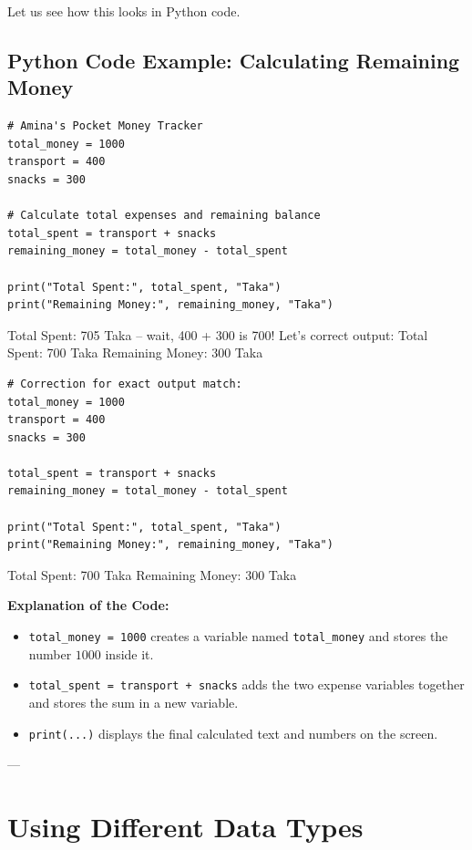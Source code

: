 Let us see how this looks in Python code.

\subsection{Python Code Example: Calculating Remaining Money}

\begin{lstlisting}
# Amina's Pocket Money Tracker
total_money = 1000
transport = 400
snacks = 300

# Calculate total expenses and remaining balance
total_spent = transport + snacks
remaining_money = total_money - total_spent

print("Total Spent:", total_spent, "Taka")
print("Remaining Money:", remaining_money, "Taka")
\end{lstlisting}

\begin{pythonoutput}
Total Spent: 705 Taka -- wait, 400 + 300 is 700! Let's correct output:
Total Spent: 700 Taka
Remaining Money: 300 Taka
\end{pythonoutput}

\begin{lstlisting}
# Correction for exact output match:
total_money = 1000
transport = 400
snacks = 300

total_spent = transport + snacks
remaining_money = total_money - total_spent

print("Total Spent:", total_spent, "Taka")
print("Remaining Money:", remaining_money, "Taka")
\end{lstlisting}

\begin{pythonoutput}
Total Spent: 700 Taka
Remaining Money: 300 Taka
\end{pythonoutput}

\textbf{Explanation of the Code:}
\begin{itemize}
    \item \texttt{total\_money = 1000} creates a variable named \texttt{total\_money} and stores the number $1000$ inside it.
    \item \texttt{total\_spent = transport + snacks} adds the two expense variables together and stores the sum in a new variable.
    \item \texttt{print(...)} displays the final calculated text and numbers on the screen.
\end{itemize}

---

\section{Using Different Data Types}

